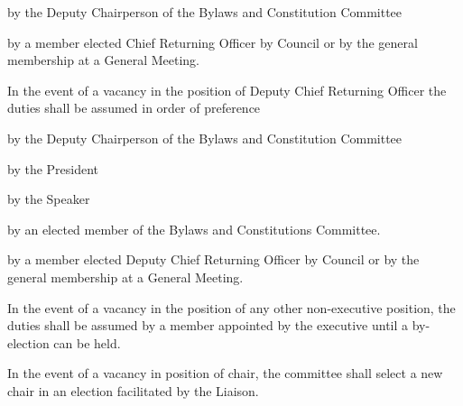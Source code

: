 \begin{longenum}[ label*=\thesubsection.\arabic*., align=left]
\begin{longenum}[ label*=\arabic*., align=left]
\begin{longenum}[ label*=\arabic*., align=left]
				\item by the Deputy Chairperson of the Bylaws and Constitution Committee
				\item by a member elected Chief Returning Officer by Council or by the general membership at a General Meeting.
			\end{longenum}
			\item In the event of a vacancy in the position of Deputy Chief Returning Officer the duties shall be assumed in order of preference
			\begin{longenum}[ label*=\arabic*., align=left]
				\item by the Deputy Chairperson of the Bylaws and Constitution Committee
				\item by the President
				\item by the Speaker
                \item by an elected member of the Bylaws and Constitutions Committee.
                \item by a member elected Deputy Chief Returning Officer by Council or by the general membership at a General Meeting.
			\end{longenum}
			\item In the event of a vacancy in the position of any other non-executive position, the duties shall be assumed by a member appointed by the executive until a by-election can be held.
			\item In the event of a vacancy in position of chair, the committee shall select a new chair in an election facilitated by the Liaison.
		\end{longenum}
	\end{longenum}
